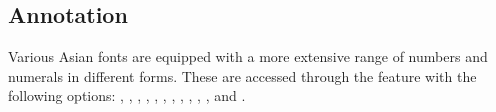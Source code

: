 \subsection{Annotation}
Various Asian fonts are equipped with a more extensive range of
numbers and numerals in different forms. These are accessed through
the  feature with the following
options: ,
, , , ,
, , , ,
, , and .

